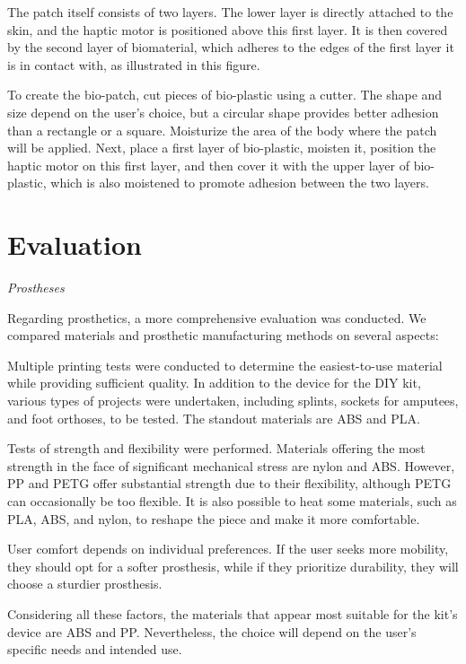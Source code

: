 The patch itself consists of two layers. The lower layer is directly attached to the skin, and the haptic motor is positioned above this first layer. It is then covered by the second layer of biomaterial, which adheres to the edges of the first layer it is in contact with, as illustrated in this figure.

To create the bio-patch, cut pieces of bio-plastic using a cutter. The shape and size depend on the user's choice, but a circular shape provides better adhesion than a rectangle or a square. Moisturize the area of the body where the patch will be applied. Next, place a first layer of bio-plastic, moisten it, position the haptic motor on this first layer, and then cover it with the upper layer of bio-plastic, which is also moistened to promote adhesion between the two layers.

\section{Evaluation}

\textit{Prostheses}

Regarding prosthetics, a more comprehensive evaluation was conducted. We compared materials and prosthetic manufacturing methods on several aspects:

Multiple printing tests were conducted to determine the easiest-to-use material while providing sufficient quality. In addition to the device for the DIY kit, various types of projects were undertaken, including splints, sockets for amputees, and foot orthoses, to be tested. The standout materials are ABS and PLA. 

Tests of strength and flexibility were performed. Materials offering the most strength in the face of significant mechanical stress are nylon and ABS. However, PP and PETG offer substantial strength due to their flexibility, although PETG can occasionally be too flexible. It is also possible to heat some materials, such as PLA, ABS, and nylon, to reshape the piece and make it more comfortable.

User comfort depends on individual preferences. If the user seeks more mobility, they should opt for a softer prosthesis, while if they prioritize durability, they will choose a sturdier prosthesis.

Considering all these factors, the materials that appear most suitable for the kit's device are ABS and PP. Nevertheless, the choice will depend on the user’s specific needs and intended use.

